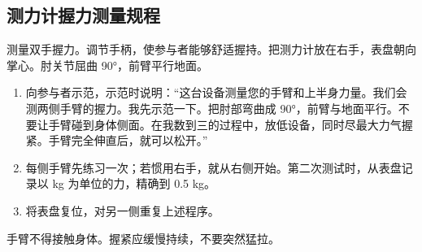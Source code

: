 \subsection{测力计握力测量规程}
测量双手握力。调节手柄，使参与者能够舒适握持。把测力计放在右手，表盘朝向掌心。肘关节屈曲 90°，前臂平行地面。
\begin{enumerate}
\item 向参与者示范，示范时说明：“这台设备测量您的手臂和上半身力量。我们会测两侧手臂的握力。我先示范一下。把肘部弯曲成 90°，前臂与地面平行。不要让手臂碰到身体侧面。在我数到三的过程中，放低设备，同时尽最大力气握紧。手臂完全伸直后，就可以松开。”
\item 每侧手臂先练习一次；若惯用右手，就从右侧开始。第二次测试时，从表盘记录以 kg 为单位的力，精确到 0.5 kg。
\item 将表盘复位，对另一侧重复上述程序。
\end{enumerate}
手臂不得接触身体。握紧应缓慢持续，不要突然猛拉。

